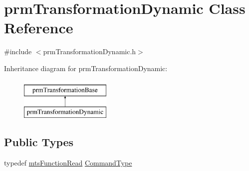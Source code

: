 \hypertarget{classprm_transformation_dynamic}{}\section{prm\+Transformation\+Dynamic Class Reference}
\label{classprm_transformation_dynamic}


{\ttfamily \#include $<$prm\+Transformation\+Dynamic.\+h$>$}

Inheritance diagram for prm\+Transformation\+Dynamic\+:\begin{figure}[H]
\begin{center}
\leavevmode
\includegraphics[height=2.000000cm]{df/d64/classprm_transformation_dynamic}
\end{center}
\end{figure}
\subsection*{Public Types}
\begin{DoxyCompactItemize}
\item 
typedef \hyperlink{classmts_function_read}{mts\+Function\+Read} \hyperlink{classprm_transformation_dynamic_a08d4a3817f09c309060cbd5a70c6cfb9}{Command\+Type}
\end{DoxyCompactItemize}
